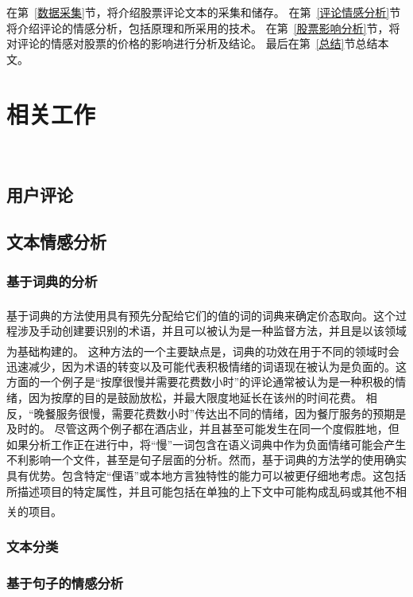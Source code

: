 \documentclass[cs4size,a4paper]{ctexart}
\numberwithin{equation}{section}
\numberwithin{table}{section}
\numberwithin{figure}{section}
\newcommand{\upcite}[1]{\textsuperscript{\textsuperscript{\cite{#1}}}}%
\begin{document}
在第~\ref{数据采集}节，将介绍股票评论文本的采集和储存。
在第~\ref{评论情感分析}节将介绍评论的情感分析，包括原理和所采用的技术。
在第~\ref{股票影响分析}节，将对评论的情感对股票的价格的影响进行分析及结论。
最后在第~\ref{总结}节总结本文。

\section{相关工作}~\label{related-work}

\subsection{用户评论}


\subsection{文本情感分析}



\subsubsection{基于词典的分析}

基于词典的方法使用具有预先分配给它们的值的词的词典来确定价态取向\upcite{chiu2015opinion}。这个过程涉及手动创建要识别的术语，并且可以被认为是一种监督方法，并且是以该领域为基础构建的\upcite{taboada2011lexicon}。
这种方法的一个主要缺点是，词典的功效在用于不同的领域时会迅速减少，因为术语的转变以及可能代表积极情绪的词语现在被认为是负面的。这方面的一个例子是“按摩很慢并需要花费数小时”的评论通常被认为是一种积极的情绪，因为按摩的目的是鼓励放松，并最大限度地延长在该州的时间花费。
相反，“晚餐服务很慢，需要花费数小时”传达出不同的情绪，因为餐厅服务的预期是及时的。
尽管这两个例子都在酒店业，并且甚至可能发生在同一个度假胜地，但如果分析工作正在进行中，将“慢”一词包含在语义词典中作为负面情绪可能会产生不利影响一个文件，甚至是句子层面的分析。然而，基于词典的方法学的使用确实具有优势。包含特定“俚语”或本地方言独特性的能力可以被更仔细地考虑。这包括所描述项目的特定属性，并且可能包括在单独的上下文中可能构成乱码或其他不相关的项目\upcite{taboada2011lexicon}。


\subsubsection{文本分类}



\subsubsection{基于句子的情感分析}
\end{document}
